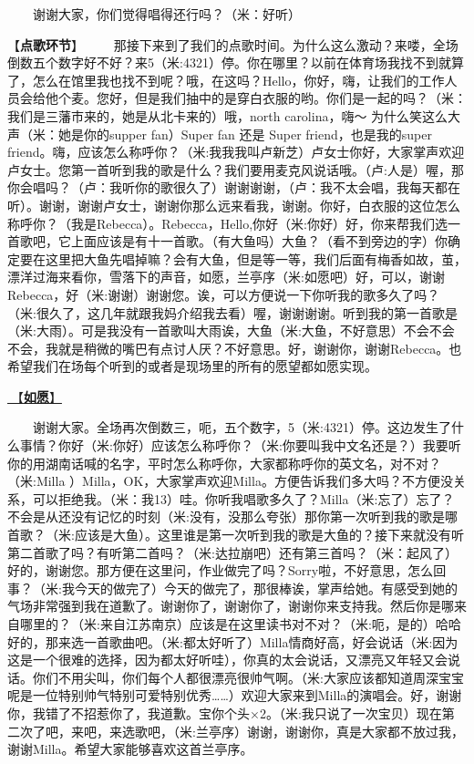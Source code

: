 \documentclass[]{ctexbook}
\begin{document}
  谢谢大家，你们觉得唱得还行吗？（米：好听）

【\textbf{点歌环节}】
  那接下来到了我们的点歌时间。为什么这么激动？来喽，全场倒数五个数字好不好？来5（米:4321）停。你在哪里？以前在体育场我找不到就算了，怎么在馆里我也找不到呢？哦，在这吗？Hello，你好，嗨，让我们的工作人员会给他个麦。您好，但是我们抽中的是穿白衣服的哟。你们是一起的吗？（米：我们是三藩市来的，她是从北卡来的）哦，north carolina，嗨～ 为什么笑这么大声（米：她是你的supper fan）Super fan 还是 Super friend，也是我的super friend。嗨，应该怎么称呼你？（米:我我我叫卢新芝）卢女士你好，大家掌声欢迎卢女士。您第一首听到我的歌是什么？我们要用麦克风说话哦。（卢:人是）喔，那你会唱吗？（卢：我听你的歌很久了）谢谢谢谢，（卢：我不太会唱，我每天都在听）。谢谢，谢谢卢女士，谢谢你那么远来看我，谢谢。你好，白衣服的这位怎么称呼你？（我是Rebecca）。Rebecca，Hello,你好（米:你好）好，你来帮我们选一首歌吧，它上面应该是有十一首歌。（有大鱼吗）大鱼？（看不到旁边的字）你确定要在这里把大鱼先唱掉嘛？会有大鱼，但是等一等，我们后面有梅香如故，茧，漂洋过海来看你，雪落下的声音，如愿，兰亭序（米:如愿吧）好，可以，谢谢Rebecca，好（米:谢谢）谢谢您。诶，可以方便说一下你听我的歌多久了吗？（米:很久了，这几年就跟我妈介绍我去看）喔，谢谢谢谢。听到我的第一首歌是（米:大雨）。可是我没有一首歌叫大雨诶，大鱼（米:大鱼，不好意思）不会不会不会，我就是稍微的嘴巴有点讨人厌？不好意思。好，谢谢你，谢谢Rebecca。也希望我们在场每个听到的或者是现场里的所有的愿望都如愿实现。

\hyperref[As-you-wish]{🎵【\textbf{如愿}】}

  谢谢大家。全场再次倒数三，呃，五个数字，5（米:4321）停。这边发生了什么事情？你好（米:你好）应该怎么称呼你？（米:你要叫我中文名还是？）我要听你的用湖南话喊的名字，平时怎么称呼你，大家都称呼你的英文名，对不对？（米:Milla ）Milla，OK，大家掌声欢迎Milla。方便告诉我们多大吗？不方便没关系，可以拒绝我。（米：我13）哇。你听我唱歌多久了？Milla（米:忘了）忘了？不会是从还没有记忆的时刻（米:没有，没那么夸张）那你第一次听到我的歌是哪首歌？（米:应该是大鱼）。这里谁是第一次听到我的歌是大鱼的？接下来就没有听第二首歌了吗？有听第二首吗？（米:达拉崩吧）还有第三首吗？（米：起风了）好的，谢谢您。那方便在这里问，作业做完了吗？Sorry啦，不好意思，怎么回事？（米:我今天的做完了）今天的做完了，那很棒诶，掌声给她。有感受到她的气场非常强到我在道歉了。谢谢你了，谢谢你了，谢谢你来支持我。然后你是哪来自哪里的？（米:来自江苏南京）应该是在这里读书对不对？（米:呃，是的）哈哈好的，那来选一首歌曲吧。（米:都太好听了）Milla情商好高，好会说话（米:因为这是一个很难的选择，因为都太好听哇），你真的太会说话，又漂亮又年轻又会说话。你们不用尖叫，你们每个人都很漂亮很帅气啊。（米:大家应该都知道周深宝宝呢是一位特别帅气特别可爱特别优秀\ldots\ldots）欢迎大家来到Milla的演唱会。好，谢谢你，我错了不招惹你了，我道歉。宝你个头×2。（米:我只说了一次宝贝）现在第二次了吧，来吧，来选歌吧，（米:兰亭序）谢谢，谢谢你，真是大家都不放过我，谢谢Milla。希望大家能够喜欢这首兰亭序。
\end{document}
